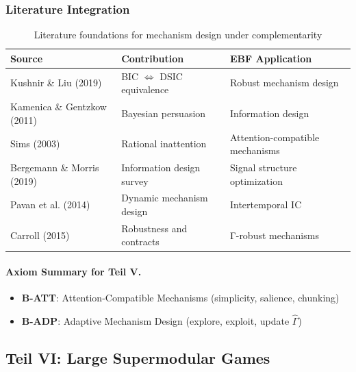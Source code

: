 \subsubsection{Literature Integration}

\begin{table}[h]
\centering
\small
\begin{tabular}{p{3.5cm}p{4cm}p{5cm}}
\toprule
\textbf{Source} & \textbf{Contribution} & \textbf{EBF Application} \\
\midrule
Kushnir \& Liu (2019) & BIC $\Leftrightarrow$ DSIC equivalence & Robust mechanism design \\
Kamenica \& Gentzkow (2011) & Bayesian persuasion & Information design \\
Sims (2003) & Rational inattention & Attention-compatible mechanisms \\
Bergemann \& Morris (2019) & Information design survey & Signal structure optimization \\
Pavan et al. (2014) & Dynamic mechanism design & Intertemporal IC \\
Carroll (2015) & Robustness and contracts & Γ-robust mechanisms \\
\bottomrule
\end{tabular}
\caption{Literature foundations for mechanism design under complementarity}
\label{tab:mechanism-lit}
\end{table}

\paragraph{Axiom Summary for Teil V.}

\begin{itemize}
    \item \textbf{B-ATT}: Attention-Compatible Mechanisms (simplicity, salience, chunking)
    \item \textbf{B-ADP}: Adaptive Mechanism Design (explore, exploit, update $\hat{\Gamma}$)
\end{itemize}




\subsection{Teil VI: Large Supermodular Games}
\label{sec:large-games}

